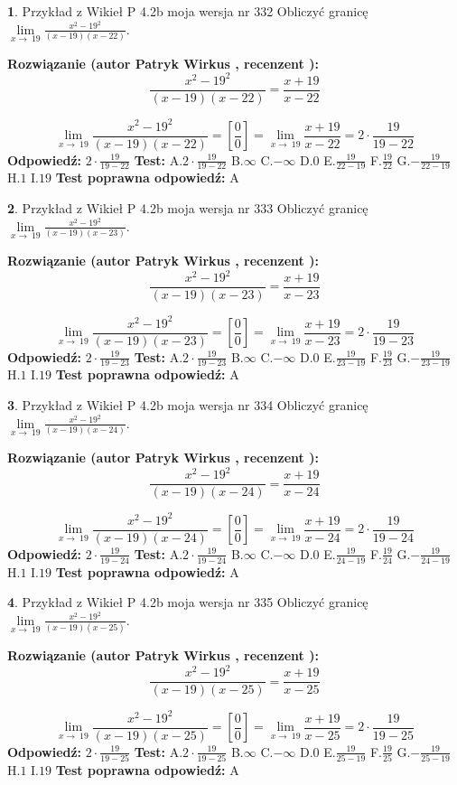 \documentclass[12pt, a4paper]{article}
\theoremstyle{definition} %
\newtheorem{zad}{}
\newcommand{\zadStart}[1]{\begin{zad}#1\newline}
\newcommand{\zadStop}{\end{zad}}
\newcommand{\rozwStart}[2]{\noindent \textbf{Rozwiązanie (autor #1 , recenzent #2): }\newline}
\newcommand{\rozwStop}{\newline}
\newcommand{\odpStart}{\noindent \textbf{Odpowiedź:}\newline}
\newcommand{\odpStop}{\newline}
\newcommand{\testStart}{\noindent \textbf{Test:}\newline}
\newcommand{\testStop}{\newline}
\newcommand{\kluczStart}{\noindent \textbf{Test poprawna odpowiedź:}\newline}
\newcommand{\kluczStop}{\newline}
\begin{document}
\zadStart{Przykład z Wikieł P 4.2b moja wersja nr 332}
Obliczyć granicę $\lim\limits_{x\to\ 19}\frac{x^{2}-19^{2}}{(x-19)(x-22)}$.
\zadStop
\rozwStart{Patryk Wirkus}{}
$$\frac{x^{2}-19^{2}}{(x-19)(x-22)}=\frac{x+19}{x-22}$$

$$\lim\limits_{x\to\ 19}\frac{x^{2}-19^{2}}{(x-19)(x-22)}=[\frac{0}{0}]=\lim\limits_{x\to\ 19}\frac{x+19}{x-22}=2 \cdot \frac{19}{19-22}$$
\rozwStop
\odpStart
$2 \cdot \frac{19}{19-22}$
\odpStop
\testStart
A.$2 \cdot \frac{19}{19-22}$
B.$\infty$
C.$-\infty$
D.$0$
E.$\frac{19}{22-19}$
F.$\frac{19}{22}$
G.$-\frac{19}{22-19}$
H.$1$
I.$19$
\testStop
\kluczStart
A
\kluczStop



\zadStart{Przykład z Wikieł P 4.2b moja wersja nr 333}
Obliczyć granicę $\lim\limits_{x\to\ 19}\frac{x^{2}-19^{2}}{(x-19)(x-23)}$.
\zadStop
\rozwStart{Patryk Wirkus}{}
$$\frac{x^{2}-19^{2}}{(x-19)(x-23)}=\frac{x+19}{x-23}$$

$$\lim\limits_{x\to\ 19}\frac{x^{2}-19^{2}}{(x-19)(x-23)}=[\frac{0}{0}]=\lim\limits_{x\to\ 19}\frac{x+19}{x-23}=2 \cdot \frac{19}{19-23}$$
\rozwStop
\odpStart
$2 \cdot \frac{19}{19-23}$
\odpStop
\testStart
A.$2 \cdot \frac{19}{19-23}$
B.$\infty$
C.$-\infty$
D.$0$
E.$\frac{19}{23-19}$
F.$\frac{19}{23}$
G.$-\frac{19}{23-19}$
H.$1$
I.$19$
\testStop
\kluczStart
A
\kluczStop



\zadStart{Przykład z Wikieł P 4.2b moja wersja nr 334}
Obliczyć granicę $\lim\limits_{x\to\ 19}\frac{x^{2}-19^{2}}{(x-19)(x-24)}$.
\zadStop
\rozwStart{Patryk Wirkus}{}
$$\frac{x^{2}-19^{2}}{(x-19)(x-24)}=\frac{x+19}{x-24}$$

$$\lim\limits_{x\to\ 19}\frac{x^{2}-19^{2}}{(x-19)(x-24)}=[\frac{0}{0}]=\lim\limits_{x\to\ 19}\frac{x+19}{x-24}=2 \cdot \frac{19}{19-24}$$
\rozwStop
\odpStart
$2 \cdot \frac{19}{19-24}$
\odpStop
\testStart
A.$2 \cdot \frac{19}{19-24}$
B.$\infty$
C.$-\infty$
D.$0$
E.$\frac{19}{24-19}$
F.$\frac{19}{24}$
G.$-\frac{19}{24-19}$
H.$1$
I.$19$
\testStop
\kluczStart
A
\kluczStop



\zadStart{Przykład z Wikieł P 4.2b moja wersja nr 335}
Obliczyć granicę $\lim\limits_{x\to\ 19}\frac{x^{2}-19^{2}}{(x-19)(x-25)}$.
\zadStop
\rozwStart{Patryk Wirkus}{}
$$\frac{x^{2}-19^{2}}{(x-19)(x-25)}=\frac{x+19}{x-25}$$

$$\lim\limits_{x\to\ 19}\frac{x^{2}-19^{2}}{(x-19)(x-25)}=[\frac{0}{0}]=\lim\limits_{x\to\ 19}\frac{x+19}{x-25}=2 \cdot \frac{19}{19-25}$$
\rozwStop
\odpStart
$2 \cdot \frac{19}{19-25}$
\odpStop
\testStart
A.$2 \cdot \frac{19}{19-25}$
B.$\infty$
C.$-\infty$
D.$0$
E.$\frac{19}{25-19}$
F.$\frac{19}{25}$
G.$-\frac{19}{25-19}$
H.$1$
I.$19$
\testStop
\kluczStart
A
\kluczStop
\end{document}

